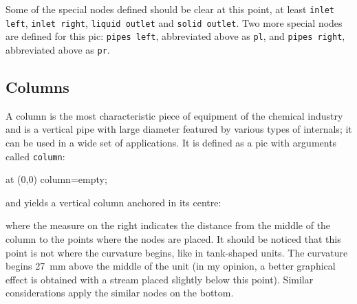 \documentclass[12pt]{article}						%
\newcommand*{\chpn}[1]{\texttt{#1}}				%
\newcommand*{\chpp}[1]{\texttt{#1}}				%
\begin{document}
Some of the special nodes defined should be clear at this point, at least
\chpn{inlet left}, \chpn{inlet right}, \chpn{liquid outlet} and
\chpn{solid outlet}. Two more special nodes are defined for this pic:
\chpn{pipes left}, abbreviated above as \chpn{pl}, and \chpn{pipes right},
abbreviated above as \chpn{pr}.

\subsection{Columns}

A column is the most characteristic piece of equipment of the chemical industry
and is a vertical pipe with large diameter featured by various types of
internals; it can be used in a wide set of applications. It is defined as a pic
with arguments called \chpp{column}:
\begin{chpcode}
	\pic at (0,0) {column=empty};
\end{chpcode}
and yields a vertical column anchored in its centre:
\begin{center}
\end{center}
where the measure on the right indicates the distance from the middle of the
column to the points where the nodes are placed. It should be noticed that this
point is not where the curvature begins, like in tank-shaped units. The curvature
begins \SI{27}{\mm} above the middle of the unit (in my opinion, a better
graphical effect is obtained with a stream placed slightly below this point).
Similar considerations apply the similar nodes on the bottom.
\end{document}
